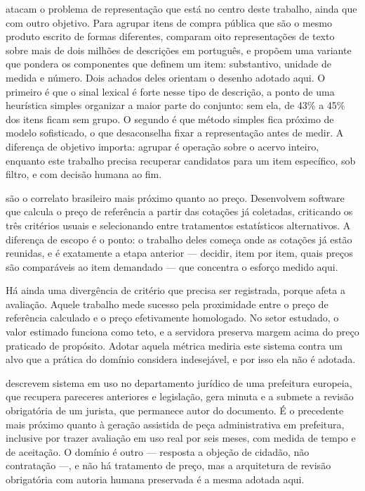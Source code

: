  atacam o problema de representação que está no
centro deste trabalho, ainda que com outro objetivo. Para agrupar itens de
compra pública que são o mesmo produto escrito de formas diferentes, comparam
oito representações de texto sobre mais de dois milhões de descrições em
português, e propõem uma variante que pondera os componentes que definem um
item: substantivo, unidade de medida e número. Dois achados deles orientam o
desenho adotado aqui. O primeiro é que o sinal lexical é forte nesse tipo de
descrição, a ponto de uma heurística simples organizar a maior parte do conjunto:
sem ela, de 43\% a 45\% dos itens ficam sem grupo. O segundo é que método simples
fica próximo de modelo sofisticado, o que desaconselha fixar a representação
antes de medir. A diferença de objetivo importa: agrupar é
operação sobre o acervo inteiro, enquanto este trabalho precisa recuperar
candidatos para um item específico, sob filtro, e com decisão humana ao fim.

 são o correlato brasileiro mais próximo quanto ao
preço. Desenvolvem software que calcula o preço de referência a partir das
cotações já coletadas, criticando os três critérios usuais e selecionando entre
tratamentos estatísticos alternativos. A diferença de escopo é o ponto: o
trabalho deles começa onde as cotações já estão reunidas, e é exatamente a etapa
anterior --- decidir, item por item, quais preços são comparáveis ao item
demandado --- que concentra o esforço medido aqui.

Há ainda uma divergência de critério que precisa ser registrada, porque afeta a
avaliação. Aquele trabalho mede sucesso pela proximidade entre o preço de
referência calculado e o preço efetivamente homologado. No setor estudado, o
valor estimado funciona como teto, e a servidora preserva margem acima do preço
praticado de propósito. Adotar aquela métrica mediria este sistema contra um
alvo que a prática do domínio considera indesejável, e por isso ela não é
adotada.

 descrevem sistema em uso no departamento
jurídico de uma prefeitura europeia, que recupera pareceres anteriores e
legislação, gera minuta e a submete a revisão obrigatória de um jurista, que
permanece autor do documento. É o precedente mais próximo quanto à geração
assistida de peça administrativa em prefeitura, inclusive por trazer avaliação em
uso real por seis meses, com medida de tempo e de aceitação. O domínio é outro
--- resposta a objeção de cidadão, não contratação ---, e não há tratamento de
preço, mas a arquitetura de revisão obrigatória com autoria humana preservada é
a mesma adotada aqui.

